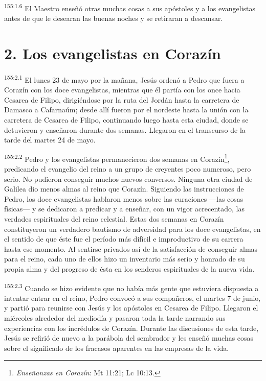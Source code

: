 \par 
\textsuperscript{155:1.6} El Maestro enseñó otras muchas cosas a sus apóstoles y a los evangelistas antes de que le desearan las buenas noches y se retiraran a descansar.

\section*{2. Los evangelistas en Corazín}
\par 
\textsuperscript{155:2.1} El lunes 23 de mayo por la mañana, Jesús ordenó a Pedro que fuera a Corazín con los doce evangelistas, mientras que él partía con los once hacia Cesarea de Filipo, dirigiéndose por la ruta del Jordán hasta la carretera de Damasco a Cafarnaúm; desde allí fueron por el nordeste hasta la unión con la carretera de Cesarea de Filipo, continuando luego hasta esta ciudad, donde se detuvieron y enseñaron durante dos semanas. Llegaron en el transcurso de la tarde del martes 24 de mayo.

\par 
\textsuperscript{155:2.2} Pedro y los evangelistas permanecieron dos semanas en Corazín\footnote{\textit{Enseñanzas en Corazín}: Mt 11:21; Lc 10:13.}, predicando el evangelio del reino a un grupo de creyentes poco numeroso, pero serio. No pudieron conseguir muchos nuevos conversos. Ninguna otra ciudad de Galilea dio menos almas al reino que Corazín. Siguiendo las instrucciones de Pedro, los doce evangelistas hablaron menos sobre las curaciones ---las cosas físicas--- y se dedicaron a predicar y a enseñar, con un vigor acrecentado, las verdades espirituales del reino celestial. Estas dos semanas en Corazín constituyeron un verdadero bautismo de adversidad para los doce evangelistas, en el sentido de que éste fue el período más difícil e improductivo de su carrera hasta ese momento. Al sentirse privados así de la satisfacción de conseguir almas para el reino, cada uno de ellos hizo un inventario más serio y honrado de su propia alma y del progreso de ésta en los senderos espirituales de la nueva vida.

\par 
\textsuperscript{155:2.3} Cuando se hizo evidente que no había más gente que estuviera dispuesta a intentar entrar en el reino, Pedro convocó a sus compañeros, el martes 7 de junio, y partió para reunirse con Jesús y los apóstoles en Cesarea de Filipo. Llegaron el miércoles alrededor del mediodía y pasaron toda la tarde narrando sus experiencias con los incrédulos de Corazín. Durante las discusiones de esta tarde, Jesús se refirió de nuevo a la parábola del sembrador y les enseñó muchas cosas sobre el significado de los fracasos aparentes en las empresas de la vida.

